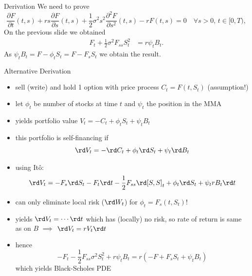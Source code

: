 \documentclass[pdf, handout]{beamer}
\begin{document}
\begin{frame}{Derivation}
We need to prove
\[
\frac{\partial F}{\partial t}(t,s) + r s \frac{\partial F}{\partial
s}(t,s) + \frac{1}{2}\sigma^2 s^2 \frac{\partial^2 F}{\partial
s^2}(t,s) -r F(t,s)=0\quad \forall s>0,\,t\in[0, T),
\]
On the previous slide we obtained
\begin{align*}
F_t + \frac{1}{2}\sigma^2 F_{ss} S_t^2    
&=  r\psi_t B_t.
\end{align*}
As $\psi_t B_t = F - \phi_t S_t = F - F_s S_t$
we obtain the result.
\end{frame}



\begin{frame}{Alternative Derivation}
\begin{itemize}
\item sell (write) and hold 1 option with price process
$C_t = F(t, S_t)$  (assumption!)
\item let $\phi_t$ be number of stocks at time $t$ and $\psi_t$ the position in the MMA 
\item yields portfolio value $V_t =  - C_t + \phi_t S_t + \psi_t B_t$
\item this portfolio is self-financing if
\[
\rd V_t =  - \rd C_t  + \phi_t \rd S_t + \psi_t \rd B_t
\]
\item 
using It\^o:
\[
\rd V_t = - F_s \rd S_t - F_t \rd t - \frac{1}{2}F_{ss} \rd [S,S]_t + \phi_t \rd S_t
+ \psi_t r B_t \rd t
\]
\item can only eliminate local risk ($\rd W_t$) for $\phi_t = F_s(t, S_t)$!
\item yields $\rd V_t = \cdots \rd t$  which has (locally) no risk, so
rate of return is same as on $B$ $\implies$ $\rd V_t =r V_t \rd t$
\item hence 
\[
-F_t - \frac{1}{2}F_{ss}\sigma^2 S_t^2 + r\psi_t B_t = r \left(  - F  + F_s S_t + \psi_t B_t
\right)
\]
which yields Black-Scholes PDE
\end{itemize}

\end{frame}
\end{document}
